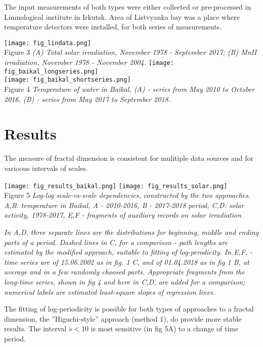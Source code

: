 \documentclass[a4paper]{article}
\begin{document}
\newpage

The input measurements of both types were either collected or pre-processed in Limnological institute in Irkutsk. Area of Listvyanka bay was a place where temperature detectors were installed, for both series of measurements. 

\noindent
\texttt{[image: fig\_lindata.png]}\\
\vskip 12pt
Figure 3 \textit{(A) Total solar irradiation, November 1978 - September 2017; (B) MnII irradiation, November 1978 - November 2004.}
\vskip 12pt
\noindent
\texttt{[image: fig\_baikal\_longseries.png]}\\
\vskip 12pt
\noindent
\texttt{[image: fig\_baikal\_shortseries.png]}\\
\vskip 12pt
Figure 4 \textit{Temperature of water in Baikal, (A) - series from May 2010 to October 2016, (B) - series from May 2017 to September 2018.}

\newpage
\section*{Results}

The measure of fractal dimension is consistent for mulitiple data sources and for varioous intervals of scales.

\texttt{[image: fig\_results\_baikal.png]}
\texttt{[image: fig\_results\_solar.png]}\\
Figure 5 \textit{Log-log scale-vs-scale dependencies, constructed by the two approaches. A,B: temperature in Baikal, A - 2010-2016, B - 2017-2018 period, C,D: solar activity, 1978-2017, E,F - fragments of auxiliary records on solar irradiation}

\textit{\small{In A,D, three separate lines are the distributions for beginning, middle and ending parts of a period. Dashed lines in C, for a comparison - path lengths are estimated by the modified approach,  suitable to fitting of log-perodicity. In E,F, - time series are of 15.06.2002 as in fig. 1 C, and of 01.04.2018 as in fig 1 B, at average and in a few randomly choosed parts. Appropriate fragments from the long-time series, shown in fig 4 and here in C,D, are added for a comparison; numerical labels are estimated least-square slopes of regression lines.}}

\vskip 12pt
The fitting of log-periodicity is possible for both types of approaches to a fractal dimension, the ''Higuchi-style'' approach (method 1), do provide more stable results. The interval $s < 10$ is most sensitive (in fig 5A) to a change of time period.
\end{document}
